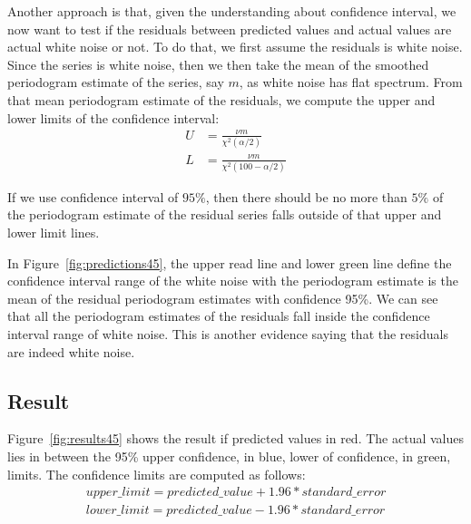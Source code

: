 \documentclass[12pt]{article}
\begin{document}
Another approach is that, given the understanding about confidence interval, we
now want to test if the residuals between predicted values and actual values are
actual white noise or not. To do that, we first assume the residuals is white
noise. Since the series is white noise, then we then take the mean of the
smoothed periodogram estimate of the series, say $m$, as white noise has flat
spectrum. From that mean periodogram estimate of the residuals, we compute
the upper and lower limits of the confidence interval:
\begin{align}
U &= \frac{\nu m}{\chi^2(\alpha/2)}\\
L &= \frac{\nu m}{\chi^2(100-\alpha/2)}
\end{align}

If we use confidence interval of $95\%$, then there should be no more than $5\%$
of the periodogram estimate of the residual series falls outside of that upper
and lower limit lines.

In Figure~\ref{fig:predictions45}, the upper read line and lower green line
define the confidence interval range of the white noise with the periodogram
estimate is the mean of the residual periodogram estimates with confidence 95\%.
We can see that all the periodogram estimates of the residuals fall inside the
confidence interval range of white noise. This is another evidence saying that the residuals are indeed white noise.


\subsection{Result}
Figure~\ref{fig:results45} shows the result if predicted values in red. The
actual values lies in between the 95\% upper confidence, in blue, lower of
confidence, in green, limits. The confidence limits are computed as follows:
\begin{align}
upper\_limit = predicted\_value + 1.96*standard\_error\\
lower\_limit = predicted\_value - 1.96*standard\_error
\end{align}
\end{document}
